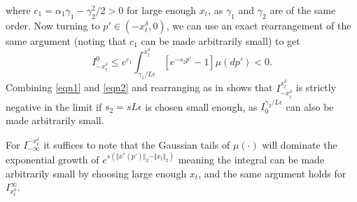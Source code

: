 \documentclass{article}
\begin{document}
where $c_{1}=\alpha_{1}\gamma_{1}-\gamma_{2}^{2}/2>0$ for large enough
$x_{t}$, as $\gamma_{1}$ and $\gamma_{2}$ are of the same order.
Now turning to $p'\in(-x_{t}^{\delta},0)$, we can use an exact rearrangement
of the same argument (noting that $c_{1}$ can be made arbitrarily
small) to get 
\begin{equation}
I_{-x_{t}^{\delta}}^{0}\leq e^{c_{1}}\int_{\gamma_{1}/L\epsilon}^{x_{t}^{\delta}}[e^{-s_{2}p'}-1]\mu(dp')<0.\label{eqn2}
\end{equation}
Combining \eqref{eqn1} and \eqref{eqn2} and rearranging as in \cite[Theorem 3.2]{mengersen1996rates}
shows that $I_{-x_{t}^{\delta}}^{x_{t}^{\delta}}$ is strictly negative
in the limit if $s_{2}=sL\epsilon$ is chosen small enough, as $I_{0}^{\gamma_{2}/L\epsilon}$
can also be made arbitrarily small.

For $I_{-\infty}^{-x_{t}^{\delta}}$ it suffices to note that the
Gaussian tails of $\mu(\cdot)$ will dominate the exponential growth
of $e^{s(\Vert x^{*}(p')\Vert_{2}-\Vert x_{t}\Vert_{2})}$ meaning
the integral can be made arbitrarily small by choosing large enough
$x_{t}$, and the same argument holds for $I_{x_{t}^{\delta}}^{\infty}$.


\end{document}
